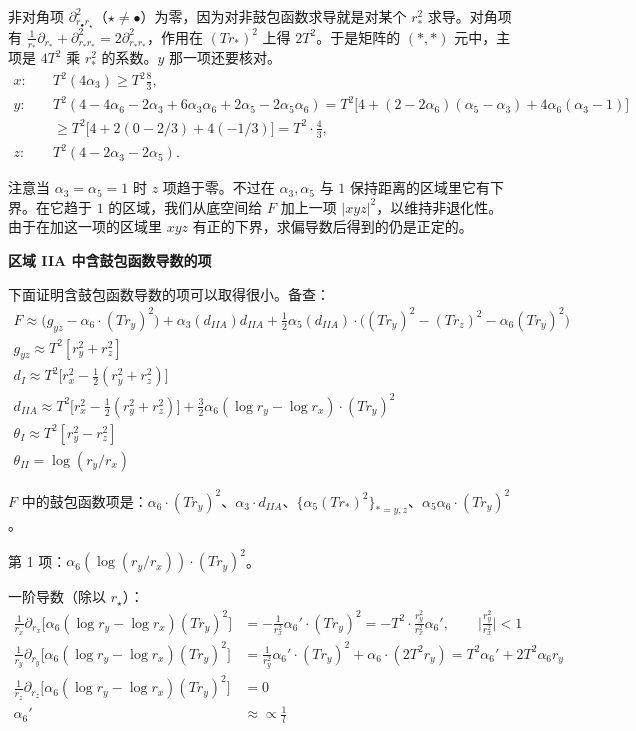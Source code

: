 非对角项 $\partial^2_{r_\bullet r_\star}$（$\star\ne\bullet$）为零，因为对非鼓包函数求导就是对某个 $r_*^2$ 求导。对角项有 $\frac{1}{r_*}\partial_{r_*}+\partial^2_{r_*r_*}=2\partial^2_{r_*r_*}$，作用在 $(Tr_*)^2$ 上得 $2T^2$。于是矩阵的 $(*,*)$ 元中，主项是 $4T^2$ 乘 $r_*^2$ 的系数。$y$ 那一项还要核对。
\begin{align*}
x:\quad &T^2(4\alpha_3)\ge T^2\frac83,\\
y:\quad &T^2(4-4\alpha_6-2\alpha_3+6\alpha_3\alpha_6+2\alpha_5-2\alpha_5\alpha_6)
=T^2\big[4+(2-2\alpha_6)(\alpha_5-\alpha_3)+4\alpha_6(\alpha_3-1)\big]\\
&\ge T^2\big[4+2(0-2/3)+4(-1/3)\big]=T^2\cdot\frac43,\\
z:\quad &T^2(4-2\alpha_3-2\alpha_5).
\end{align*}

注意当 $\alpha_3=\alpha_5=1$ 时 $z$ 项趋于零。不过在 $\alpha_3,\alpha_5$ 与 $1$ 保持距离的区域里它有下界。在它趋于 $1$ 的区域，我们从底空间给 $F$ 加上一项 $|xyz|^2$，以维持非退化性。由于在加这一项的区域里 $xyz$ 有正的下界，求偏导数后得到的仍是正定的。

\medskip
\noindent\textbf{区域 IIA 中含鼓包函数导数的项}\par
下面证明含鼓包函数导数的项可以取得很小。备查：
\begin{gather*}
F\approx\big(g_{yz}-\alpha_6\cdot(Tr_y)^2\big)+\alpha_3(d_{IIA})d_{IIA}
+\frac12\alpha_5(d_{IIA})\cdot\big((Tr_y)^2-(Tr_z)^2-\alpha_6(Tr_y)^2\big)\\
g_{yz}\approx T^2[r_y^2+r_z^2]\\
d_I\approx T^2\Big[r_x^2-\frac12(r_y^2+r_z^2)\Big]\\
d_{IIA}\approx T^2\Big[r_x^2-\frac12(r_y^2+r_z^2)\Big]+\frac32\alpha_6(\log r_y-\log r_x)\cdot(Tr_y)^2\\
\theta_I\approx T^2[r_y^2-r_z^2]\\
\theta_{II}=\log(r_y/r_x)
\end{gather*}

$F$ 中的鼓包函数项是：$\alpha_6\cdot(Tr_y)^2$、$\alpha_3\cdot d_{IIA}$、$\{\alpha_5(Tr_*)^2\}_{*=y,z}$、$\alpha_5\alpha_6\cdot(Tr_y)^2$。

第 1 项：$\alpha_6(\log(r_y/r_x))\cdot(Tr_y)^2$。

\medskip
\noindent 一阶导数（除以 $r_\star$）：
\begin{align*}
\frac{1}{r_x}\partial_{r_x}\big[\alpha_6(\log r_y-\log r_x)(Tr_y)^2\big]
&=-\frac{1}{r_x^2}\alpha_6'\cdot(Tr_y)^2=-T^2\cdot\frac{r_y^2}{r_x^2}\alpha_6',
\qquad\Big|\frac{r_y^2}{r_x^2}\Big|<1\\
\frac{1}{r_y}\partial_{r_y}\big[\alpha_6(\log r_y-\log r_x)(Tr_y)^2\big]
&=\frac{1}{r_y^2}\alpha_6'\cdot(Tr_y)^2+\alpha_6\cdot(2T^2r_y)=T^2\alpha_6'+2T^2\alpha_6r_y\\
\frac{1}{r_z}\partial_{r_z}\big[\alpha_6(\log r_y-\log r_x)(Tr_y)^2\big]&=0\\
\alpha_6'&\approx\propto\frac1l
\end{align*}

